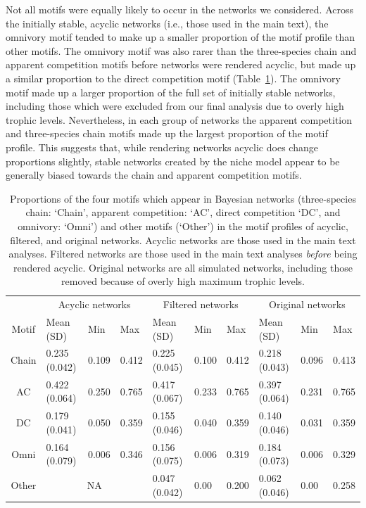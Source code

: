 \documentclass[12pt]{article}
\begin{document}
\begin{spacing}{2.0}
    Not all motifs were equally likely to occur in the networks we considered. 
    Across the initially stable, acyclic networks (i.e., those used in the main text), the omnivory motif tended to make up a smaller proportion of the motif profile than other motifs.
    The omnivory motif was also rarer than the three-species chain and apparent competition motifs before networks were rendered acyclic, but made up a similar proportion to the direct competition motif (Table~\ref{tab:acyclic_proportions}).
    The omnivory motif made up a larger proportion of the full set of initially stable networks, including those which were excluded from our final analysis due to overly high trophic levels.
    Nevertheless, in each group of networks the apparent competition and three-species chain motifs made up the largest proportion of the motif profile.
    This suggests that, while rendering networks acyclic does change proportions slightly, stable networks created by the niche model appear to be generally biased towards the chain and apparent competition motifs.
    
    \begin{table}[h!]
        \centering
        \caption{Proportions of the four motifs which appear in Bayesian networks (three-species chain: `Chain', apparent competition: `AC', direct competition `DC', and omnivory: `Omni') and other motifs (`Other') in the motif profiles of acyclic, filtered, and original networks. Acyclic networks are those used in the main text analyses. Filtered networks are those used in the main text analyses \emph{before} being rendered acyclic. Original networks are all simulated networks, including those removed because of overly high maximum trophic levels.}
        \label{tab:acyclic_proportions}            \footnotesize
        \begin{tabular}{c|l l l | l l l | l l l |}
        & \multicolumn{3}{c|}{Acyclic networks} & \multicolumn{3}{c|}{Filtered networks} & \multicolumn{3}{c|}{Original networks} \\
        Motif & Mean (SD) & Min & Max & Mean (SD) & Min & Max & Mean (SD) & Min & Max \\
        \hline
        Chain & 0.235 (0.042) & 0.109 & 0.412 & 0.225 (0.045) & 0.100 & 0.412 & 0.218 (0.043) & 0.096 & 0.413 \\
        AC & 0.422 (0.064) & 0.250 & 0.765 &
        0.417 (0.067) & 0.233 & 0.765 & 0.397 (0.064) & 0.231 & 0.765 \\
        DC & 0.179 (0.041) & 0.050 & 0.359 & 0.155 (0.046) & 0.040 & 0.359 & 0.140 (0.046) & 0.031 & 0.359 \\
        Omni & 0.164 (0.079) & 0.006 & 0.346 & 0.156 (0.075) & 0.006 & 0.319 & 0.184 (0.073) & 0.006 & 0.329 \\
        \hline
        Other & \multicolumn{3}{c|}{NA} & 0.047 (0.042) & 0.00 & 0.200 &
        0.062 (0.046) & 0.00 & 0.258 \\
        \end{tabular}
    \end{table}


\end{spacing}
\end{document}
